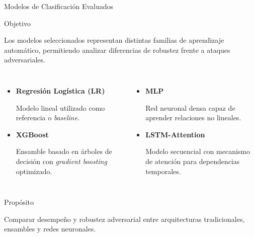 \documentclass[aspectratio=169, 8pt]{beamer}
\begin{document}
\begin{frame}{Modelos de Clasificación Evaluados}

\begin{block}{Objetivo}

Los modelos seleccionados representan
distintas familias de aprendizaje automático,
permitiendo analizar diferencias de robustez
frente a ataques adversariales.

\end{block}

\vspace{0.2cm}

\begin{columns}


\begin{itemize}

\item \textbf{Regresión Logística (LR)}

Modelo lineal utilizado como referencia
o \textit{baseline}.

\vspace{0.15cm}

\item \textbf{XGBoost}

Ensamble basado en árboles de decisión
con \textit{gradient boosting} optimizado.

\end{itemize}



\begin{itemize}

\item \textbf{MLP}

Red neuronal densa capaz de aprender
relaciones no lineales.

\vspace{0.15cm}

\item \textbf{LSTM-Attention}

Modelo secuencial con mecanismo
de atención para dependencias temporales.

\end{itemize}

\end{columns}

\vspace{0.2cm}

\begin{alertblock}{Propósito}

Comparar desempeño y robustez adversarial
entre arquitecturas tradicionales,
ensambles y redes neuronales.

\end{alertblock}

\end{frame}
\end{document}
